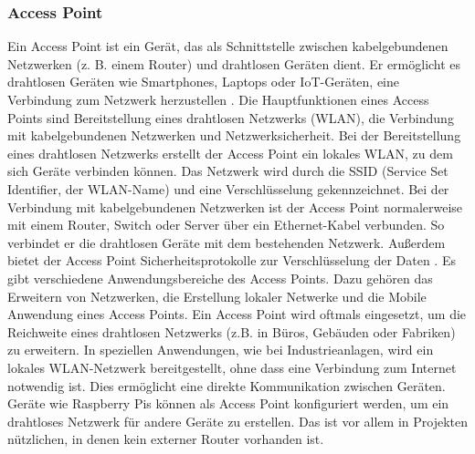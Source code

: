 \subsubsection{Access Point}
Ein Access Point ist ein Gerät, das als Schnittstelle zwischen kabelgebundenen Netzwerken (z. B. einem Router) und drahtlosen Geräten dient. Er ermöglicht es drahtlosen Geräten wie Smartphones, Laptops oder IoT-Geräten, eine Verbindung zum Netzwerk herzustellen \cite{heise_accesspoint_2025}.
\newline 
\newline 
Die Hauptfunktionen eines Access Points sind Bereitstellung eines drahtlosen Netzwerks (WLAN), die Verbindung mit kabelgebundenen Netzwerken und Netzwerksicherheit.
\newline
Bei der Bereitstellung eines drahtlosen Netzwerks erstellt der Access Point ein lokales WLAN, zu dem sich Geräte verbinden können. Das Netzwerk wird durch die SSID (Service Set Identifier, der WLAN-Name) und eine Verschlüsselung gekennzeichnet.
\newline
Bei der Verbindung mit kabelgebundenen Netzwerken ist der Access Point normalerweise mit einem Router, Switch oder Server über ein Ethernet-Kabel verbunden. So verbindet er die drahtlosen Geräte mit dem bestehenden Netzwerk.
\newline 
Außerdem bietet der Access Point Sicherheitsprotokolle zur Verschlüsselung der Daten \cite{wikipedia_accesspoint_2025}.
\newline 
Es gibt verschiedene Anwendungsbereiche des Access Points. Dazu gehören das Erweitern von Netzwerken, die Erstellung lokaler Netwerke und die Mobile Anwendung eines Access Points. 
\newline 
Ein Access Point wird oftmals eingesetzt, um die Reichweite eines drahtlosen Netzwerks (z.B. in Büros, Gebäuden oder Fabriken) zu erweitern.
\newline 
In  speziellen Anwendungen, wie bei Industrieanlagen, wird ein lokales WLAN-Netzwerk bereitgestellt, ohne dass eine Verbindung zum Internet notwendig ist. Dies ermöglicht eine direkte Kommunikation zwischen Geräten.
\newline 
Geräte wie Raspberry Pis können als Access Point konfiguriert werden, um ein drahtloses Netzwerk für andere Geräte zu erstellen. Das ist vor allem in Projekten nützlichen, in denen kein externer Router vorhanden ist.
\newline 
\newline 
